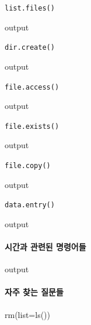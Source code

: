 \documentclass{report}
\begin{document}
\texttt{list.files()}
\begin{Schunk}
\begin{Soutput}
output
\end{Soutput}
\end{Schunk}

\texttt{dir.create()}
\begin{Schunk}
\begin{Soutput}
output
\end{Soutput}
\end{Schunk}

\texttt{file.access()}
\begin{Schunk}
\begin{Soutput}
output
\end{Soutput}
\end{Schunk}

\texttt{file.exists()}
\begin{Schunk}
\begin{Soutput}
output
\end{Soutput}
\end{Schunk}

\texttt{file.copy()}
\begin{Schunk}
\begin{Soutput}
output
\end{Soutput}
\end{Schunk}

\texttt{data.entry()}
\begin{Schunk}
\begin{Soutput}
output
\end{Soutput}
\end{Schunk}

\paragraph{시간과 관련된 명령어들}
\begin{Schunk}
\begin{Soutput}
output
\end{Soutput}
\end{Schunk}

\paragraph{자주 찾는 질문들}
\begin{Schunk}
\begin{Soutput}
rm(list=ls())
\end{Soutput}
\end{Schunk}
\end{document}
